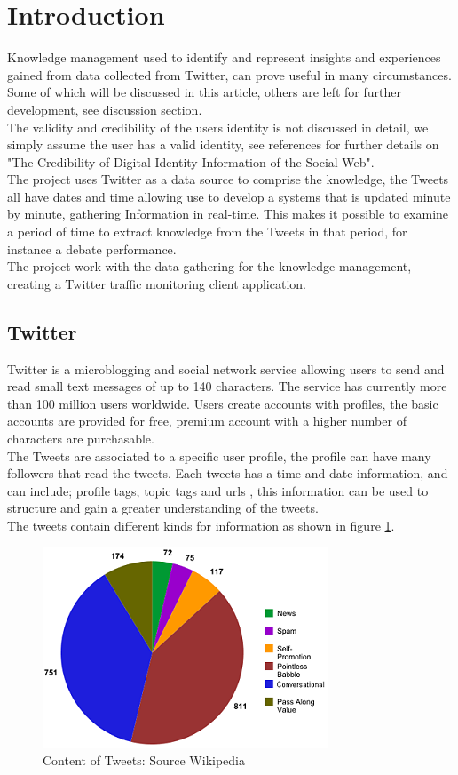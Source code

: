 \documentclass[]{article}  %
\begin{document}
\section{Introduction}
Knowledge management used to identify and represent insights and experiences gained from data collected from Twitter, can prove useful in many circumstances. Some of which will be discussed in this article, others are left for further development, see discussion section. \\ The validity and credibility of the users identity is not discussed  in detail, we simply assume the user has a valid identity, see references for further details on "The Credibility of Digital Identity Information of the Social Web". \\ The project uses Twitter as a data source to comprise the knowledge, the Tweets all have dates and time allowing use to develop a systems that is updated minute by minute, gathering Information in real-time. This makes it possible to examine a period of time to extract knowledge from the Tweets in that period, for instance a debate performance\cite{bib10}.\\  The project work with the data gathering for the knowledge management, creating a Twitter traffic monitoring client application.

	
\subsection{Twitter}
Twitter is a microblogging and social network service allowing users to send and read small text messages of up to 140 characters. The service has currently more than 100 million users worldwide. Users create accounts with profiles, the basic accounts are provided for free, premium account with a higher number of characters are purchasable. \\ The Tweets are associated to a specific user profile, the profile can have many followers that read the tweets. Each tweets has a time and date information, and can include; profile tags, topic tags and urls , this information can be used to structure and gain a greater understanding of the tweets. \\ The tweets contain different kinds for information as shown in figure \ref{figContent}. 

\begin{figure}[h]
\centering
\includegraphics[scale=1]{Content_of_Tweets_Graphed.png}
\caption{Content of Tweets: Source Wikipedia}
\label{figContent}
\end{figure}
 
\end{document}
